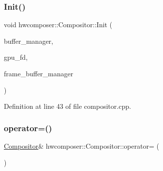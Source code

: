\subsubsection{\texorpdfstring{Init()}{Init()}}
{\footnotesize\ttfamily void hwcomposer\+::\+Compositor\+::\+Init (\begin{DoxyParamCaption}\item[{\mbox{\hyperlink{classhwcomposer_1_1ResourceManager}{Resource\+Manager}} $\ast$}]{buffer\+\_\+manager,  }\item[{uint32\+\_\+t}]{gpu\+\_\+fd,  }\item[{\mbox{\hyperlink{classhwcomposer_1_1FrameBufferManager}{Frame\+Buffer\+Manager}} $\ast$}]{frame\+\_\+buffer\+\_\+manager }\end{DoxyParamCaption})}



Definition at line 43 of file compositor.\+cpp.


\begin{DoxyCode}{0}
\end{DoxyCode}
\mbox{\label{classhwcomposer_1_1Compositor_a12222f05927fd066716497c72377c4ab}} 
\subsubsection{\texorpdfstring{operator=()}{operator=()}}
{\footnotesize\ttfamily \mbox{\hyperlink{classhwcomposer_1_1Compositor}{Compositor}}\& hwcomposer\+::\+Compositor\+::operator= (\begin{DoxyParamCaption}\item[{const \mbox{\hyperlink{classhwcomposer_1_1Compositor}{Compositor}} \&}]{ }\end{DoxyParamCaption})\hspace{0.3cm}{\ttfamily [delete]}}

\mbox{\label{classhwcomposer_1_1Compositor_a9e48d65a1b926f921acccccba51b69dc}} 

